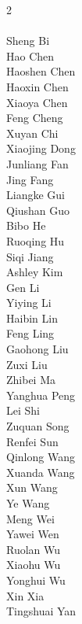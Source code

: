 \begin{multicols}{2}
\noindent
{} \\
\\
\color{black}Sheng Bi\\
\color{black}Hao Chen\\
\color{black}Haoshen Chen\\
\color{black}Haoxin Chen\\
\color{black}Xiaoya Chen\\
\color{black}Feng Cheng\\
\color{black}Xuyan Chi\\
\color{black}Xiaojing Dong\\
\color{black}Junliang Fan\\
\color{black}Jing Fang\\
\color{black}Liangke Gui\\
\color{black}Qiushan Guo\\
\color{black}Bibo He\\
\color{black}Ruoqing Hu\\
\color{black}Siqi Jiang\\
\color{black}Ashley Kim\\
\color{black}Gen Li\\
\color{black}Yiying Li\\
\color{black}Haibin Lin\\
\color{black}Feng Ling\\
\color{black}Gaohong Liu\\
\color{black}Zuxi Liu\\
\color{black}Zhibei Ma\\
\color{black}Yanghua Peng\\
\color{black}Lei Shi\\
\color{black}Zuquan Song\\
\color{black}Renfei Sun\\
\color{black}Qinlong Wang\\
\color{black}Xuanda Wang\\
\color{black}Xun Wang\\
\color{black}Ye Wang\\
\color{black}Meng Wei\\
\color{black}Yawei Wen\\
\color{black}Ruolan Wu\\
\color{black}Xiaohu Wu\\
\color{black}Yonghui Wu\\
\color{black}Xin Xia\\
\color{black}Tingshuai Yan\\

\end{multicols}
